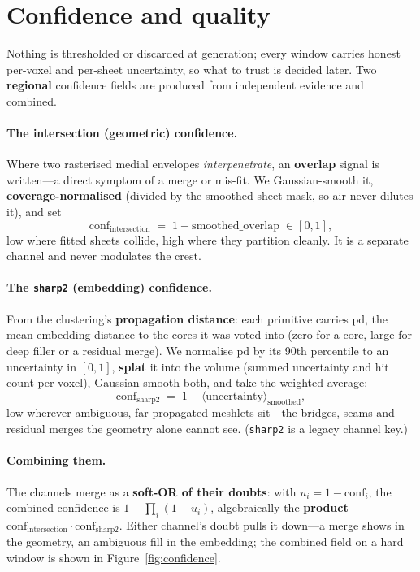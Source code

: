 \documentclass[10pt,twocolumn,a4paper]{article}
\newcommand{\code}[1]{\texttt{#1}}
\begin{document}
\section{Confidence and quality}\label{sec:confidence}
Nothing is thresholded or discarded at generation; every window carries honest
per-voxel and per-sheet uncertainty, so what to trust is decided later. Two
\textbf{regional} confidence fields are produced from independent evidence and
combined.

\paragraph{The intersection (geometric) confidence.} Where two rasterised medial
envelopes \emph{interpenetrate}, an \textbf{overlap} signal is written---a direct
symptom of a merge or mis-fit. We Gaussian-smooth it, \textbf{coverage-normalised}
(divided by the smoothed sheet mask, so air never dilutes it), and set
\begin{equation}
  \mathrm{conf}_{\text{intersection}} \;=\; 1 - \mathrm{smoothed\_overlap}
  \;\in[0,1],
\end{equation}
low where fitted sheets collide, high where they partition cleanly. It is a
separate channel and never modulates the crest.

\paragraph{The \code{sharp2} (embedding) confidence.} From the clustering's
\textbf{propagation distance}: each primitive carries $\mathrm{pd}$, the mean
embedding distance to the cores it was voted into (zero for a core, large for deep
filler or a residual merge). We normalise $\mathrm{pd}$ by its 90th percentile to
an uncertainty in $[0,1]$, \textbf{splat} it into the volume (summed uncertainty
and hit count per voxel), Gaussian-smooth both, and take the weighted average:
\begin{equation}
  \mathrm{conf}_{\text{sharp2}} \;=\; 1 - \langle\text{uncertainty}\rangle_{\text{smoothed}},
\end{equation}
low wherever ambiguous, far-propagated meshlets sit---the bridges, seams and
residual merges the geometry alone cannot see. (\code{sharp2} is a legacy channel
key.)

\paragraph{Combining them.} The channels merge as a \textbf{soft-OR of their
doubts}: with $u_i=1-\mathrm{conf}_i$, the combined confidence is
$1-\prod_i(1-u_i)$, algebraically the \textbf{product}
$\mathrm{conf}_{\text{intersection}}\cdot\mathrm{conf}_{\text{sharp2}}$. Either
channel's doubt pulls it down---a merge shows in the geometry, an ambiguous fill in
the embedding; the combined field on a hard window is shown in
Figure~\ref{fig:confidence}.
\end{document}
